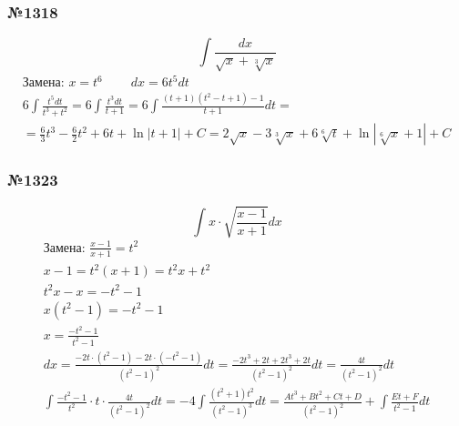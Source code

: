 \documentclass{article}
\begin{document}
\subsubsection{№1318}
\[
    \int \frac{dx}{\sqrt{x} + \sqrt[3]{x}}
\]
\begin{gather*}
    \text{Замена: } x = t^6 ~~~~~~~~~~ dx = 6t^5dt \\
    6 \int \frac{t^5 dt}{t^3 + t^2} =
    6 \int \frac{t^3 dt}{t + 1} =
    6 \int \frac{(t + 1)(t^2 - t + 1) - 1}{t + 1} dt = \\
    = \frac{6}{3}t^3 - \frac{6}{2}t^2 + 6t + \ln \left|t + 1\right| + C =
    2 \sqrt{x} - 3 \sqrt[3]{x} + 6 \sqrt[6]{t} + \ln \left|\sqrt[6]{x} + 1\right| + C
\end{gather*}

\subsubsection{№1323}
\[
    \int x \cdot \sqrt{\frac{x - 1}{x + 1}} dx
\]
\begin{gather*}
    \text{Замена: } \frac{x - 1}{x + 1} = t^2 \\
    x - 1 = t^2(x + 1) = t^2 x + t^2 \\
    t^2x - x = -t^2 - 1 \\
    x(t^2 - 1) = -t^2 - 1 \\
    x = \frac{-t^2 - 1}{t^2 - 1} \\
    dx = \frac{-2t \cdot (t^2 - 1) - 2t \cdot (-t^2 - 1)}{(t^2 - 1)^2} dt = 
    \frac{-2t^3 + 2t + 2t^3 + 2t}{(t^2 - 1)^2} dt =
    \frac{4t}{(t^2 - 1)^2} dt \\
    \int \frac{-t^2 - 1}{t^2} \cdot t \cdot \frac{4t}{(t^2 - 1)^2} dt = 
    -4\int \frac{(t^2 + 1)t^2}{(t^2 - 1)^3} dt = 
    \frac{At^3 + Bt^2 + Ct + D}{(t^2 - 1)^2} + \int \frac{Et + F}{t^2 - 1} dt
\end{gather*}
\end{document}
